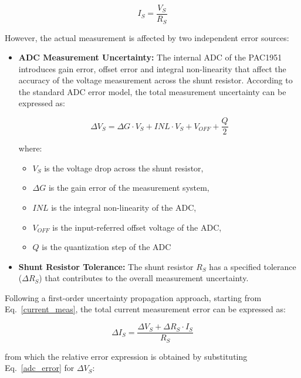 \begin{equation}\label{current_meas}
I_S = \frac{V_{S}}{R_S}
\end{equation}

However, the actual measurement is affected by two independent error sources:
\begin{itemize}
    \item \textbf{ADC Measurement Uncertainty:} The internal ADC of the PAC1951 introduces gain error, offset error and integral non-linearity that affect the accuracy of the voltage measurement across the shunt resistor.
    According to the standard ADC error model, the total measurement uncertainty can be expressed as:

    \begin{equation}\label{adc_error}
        \Delta V_{S} = \Delta G \cdot V_{S} + INL \cdot V_{S} + V_{OFF} + \frac{Q}{2}
    \end{equation}

    where:
    \begin{itemize}
        \item $V_{S}$ is the voltage drop across the shunt resistor,
        \item $\Delta G$ is the gain error of the measurement system,
        \item $INL$ is the integral non-linearity of the ADC,
        \item $V_{OFF}$ is the input-referred offset voltage of the ADC,
        \item $Q$ is the quantization step of the ADC
    \end{itemize}
    
    \item \textbf{Shunt Resistor Tolerance:} The shunt resistor $R_S$ has a specified tolerance ($\Delta R_S$) that contributes to the overall measurement uncertainty.

\end{itemize}

Following a first-order uncertainty propagation approach, starting from Eq.~\ref{current_meas}, the total current measurement error can be expressed as:

\begin{equation}
\Delta I_S = \frac{\Delta V_{S} + \Delta R_{S} \cdot I_S}{R_S}
\end{equation}

from which the relative error expression is obtained by substituting Eq.~\ref{adc_error} for $\Delta V_{S}$:

